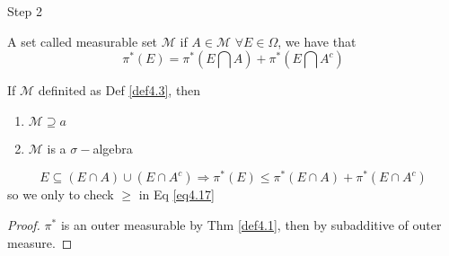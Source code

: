  {\large Step 2}
 
 \begin{definition}
 	A set called measurable set $ \mathcal{M} $ if $ A \in \mathcal{M} $  $ \forall E \in \Omega $, we have that
 	\begin{equation}
 	{\pi ^*}\left( E \right) = {\pi ^*}\left( {E\bigcap A } \right) + {\pi ^*}\left( {E\bigcap {{A^c}} } \right)
 	\label{eq4.17}
 	\end{equation}
 	\label{def4.3}
 \end{definition}

\begin{theorem}
	If $ \mathcal{M} $ definited as Def \ref{def4.3}, then 
	\begin{enumerate}
		\item $\mathcal{M} \supseteq a$
		\item $ \mathcal{M} $ is a $ \sigma- $algebra
	\end{enumerate}
     \label{thm4.2}
\end{theorem}

\begin{remark}
	\begin{equation}
	E \subseteq \left( {E \cap A} \right) \cup \left( {E \cap {A^c}} \right) \Rightarrow {\pi ^*}\left( E \right) \leqslant {\pi ^*}\left( {E \cap A} \right) + {\pi ^*}\left( {E \cap {A^c}} \right)
	\label{eq4.18}
	\end{equation}
	so we only to check $ \ge $ in Eq \ref{eq4.17}
	\label{rmk4.1}
\end{remark}

\begin{proof}
	${\pi ^*}$ is an outer measurable by Thm \ref{def4.1}, then by subadditive of outer measure.
\end{proof}

